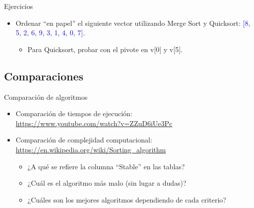 \documentclass{beamer} %
\newcommand{\blue}[1]{\textcolor{blue}{#1}}
\begin{document}
\begin{frame}{Ejercicios}
    \begin{itemize}
        \item Ordenar ``en papel'' el siguiente vector utilizando Merge Sort y Quicksort: \blue{[8, 5, 2, 6, 9, 3, 1, 4, 0, 7]}.
        \begin{itemize}
            \item Para Quicksort, probar con el pivote en v[0] y v[5].
        \end{itemize}
    \end{itemize}
\end{frame}

\subsection{Comparaciones}

\begin{frame}{Comparación de algoritmos}
    \begin{itemize}
        \item Comparación de tiempos de ejecución:\\
        \blue{\url{https://www.youtube.com/watch?v=ZZuD6iUe3Pc}}
        \item Comparación de complejidad computacional:\\
        \blue{\url{https://en.wikipedia.org/wiki/Sorting_algorithm}}
        \begin{itemize}
            \item ¿A qué se refiere la columna ``Stable'' en las tablas?
            \item ¿Cuál es el algoritmo más malo (sin lugar a dudas)?
            \item ¿Cuáles son los mejores algoritmos dependiendo de cada criterio?
        \end{itemize}
    \end{itemize}
\end{frame}

\end{document}
